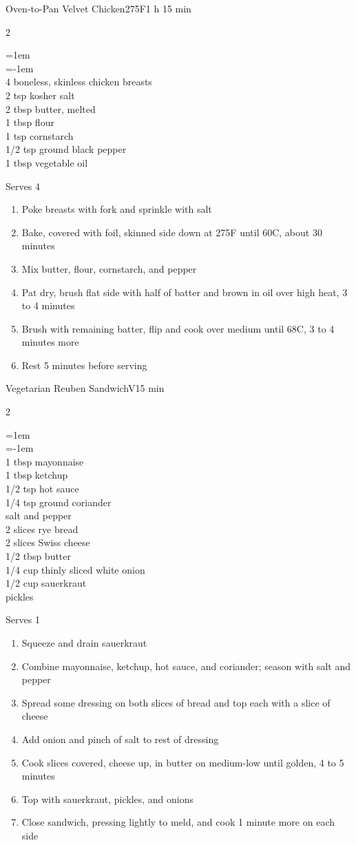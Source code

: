 \documentclass{article}
\newenvironment{recipe}[3][]
    {\begin{cardbase}[#1]{#2}{#3}
    \columnratio{0.333}
    \begin{paracol}{2}}
    {\end{paracol}\end{cardbase}}
\newenvironment{denserecipe}[3][]
    {\small
    \begin{recipe}[#1]{#2}{#3}}
    {\end{recipe}}
\newcommand{\nextcolumn}{\switchcolumn}
\newenvironment{ingredients}
    {
    \begin{obeylines}
    \vspace{\parskip}
    \setlength{\parskip}{0.25em}
    \vspace{-0.25em}
    \leftskip=1em
    \parindent=-1em}
    {\end{obeylines}}
\newenvironment{steps}
    {\begin{enumerate}[leftmargin=*,topsep=0pt]}
    {\end{enumerate}}
\newcommand{\celsius}[1]{#1\textdegree{}C}
\newcommand{\fahrenheit}[1]{#1\textdegree{}F}
\newcommand{\tag}[1]{\hspace{1em}#1}
\newcommand{\symboltag}[2]{\tag{#1\hspace{0.4em}#2}}
\newcommand{\totaltime}[1]{\symboltag{\raisebox{-0.1em}{\small\StopWatchEnd}}{#1}}
\newcommand{\preheat}[1]{\symboltag{\Topbottomheat}{#1}}
\begin{document}
\begin{denserecipe}{Oven-to-Pan Velvet Chicken}{\preheat{\fahrenheit{275}}\totaltime{1 h 15 min}}
\begin{ingredients}
4 boneless, skinless chicken breasts
2 tsp kosher salt
2 tbsp butter, melted
1 tbsp flour
1 tsp cornstarch
1/2 tsp ground black pepper
1 tbsp vegetable oil
\end{ingredients}
\nextcolumn
Serves 4
\begin{steps}
    \item Poke breasts with fork and sprinkle with salt
    \item Bake, covered with foil, skinned side down at \fahrenheit{275} until \celsius{60}, about 30 minutes
    \item Mix butter, flour, cornstarch, and pepper
    \item Pat dry, brush flat side with half of batter and brown in oil over high heat, 3 to 4 minutes
    \item Brush with remaining batter, flip and cook over medium until \celsius{68}, 3 to 4 minutes more
    \item Rest 5 minutes before serving
\end{steps}
\end{denserecipe}

\begin{denserecipe}{Vegetarian Reuben Sandwich}{\tag{V}\totaltime{15 min}}
\begin{ingredients}
1 tbsp mayonnaise
1 tbsp ketchup
1/2 tsp hot sauce
1/4 tsp ground coriander
salt and pepper
2 slices rye bread
2 slices Swiss cheese
1/2 tbsp butter
1/4 cup thinly sliced white onion
1/2 cup sauerkraut
pickles
\end{ingredients}
\nextcolumn
Serves 1
\begin{steps}
    \item Squeeze and drain sauerkraut
    \item Combine mayonnaise, ketchup, hot sauce, and coriander; season with salt and pepper
    \item Spread some dressing on both slices of bread and top each with a slice of cheese
    \item Add onion and pinch of salt to rest of dressing
    \item Cook slices covered, cheese up, in butter on medium-low until golden, 4 to 5 minutes
    \item Top with sauerkraut, pickles, and onions
    \item Close sandwich, pressing lightly to meld, and cook 1 minute more on each side
\end{steps}
\end{denserecipe}
\end{document}
